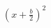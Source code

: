 \documentclass[preview]{standalone}
\begin{document}
\begin{align*}
\left(x + \frac{b}{2}\right)^2
\end{align*}
\end{document}

